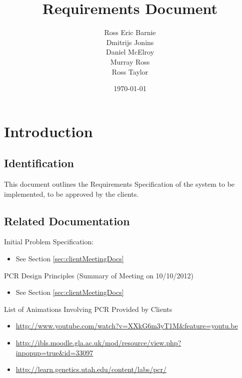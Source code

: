 \documentclass{l3deliverable}
\title{Requirements Document}
\author{Ross Eric Barnie \\
        Dmitrijs Jonins \\
        Daniel McElroy \\
        Murray Ross \\
        Ross Taylor
      }
\date{\today}
\begin{document}

\maketitle

\tableofcontents

\newpage


\section{Introduction}

\subsection{Identification}

This document outlines the Requirements Specification of the system to
be implemented, to be approved by the clients.

\subsection{Related Documentation}


Initial Problem Specification:
\begin{itemize}
\item{See Section \ref{sec:clientMeetingDocs}} %
\end{itemize}

PCR Design Principles (Summary of Meeting on 10/10/2012)
\begin{itemize}
\item{See Section \ref{sec:clientMeetingDocs}} 
\end{itemize}

List of Animations Involving PCR Provided by Clients
\begin{itemize}
\item{\url{http://www.youtube.com/watch?v=XXkG6m3yT1M&feature=youtu.be}}
\item{\url{http://ibls.moodle.gla.ac.uk/mod/resource/view.php?inpopup=true&id=33097}}
\item{\url{http://learn.genetics.utah.edu/content/labs/pcr/}}
\end{itemize}
\end{document}
